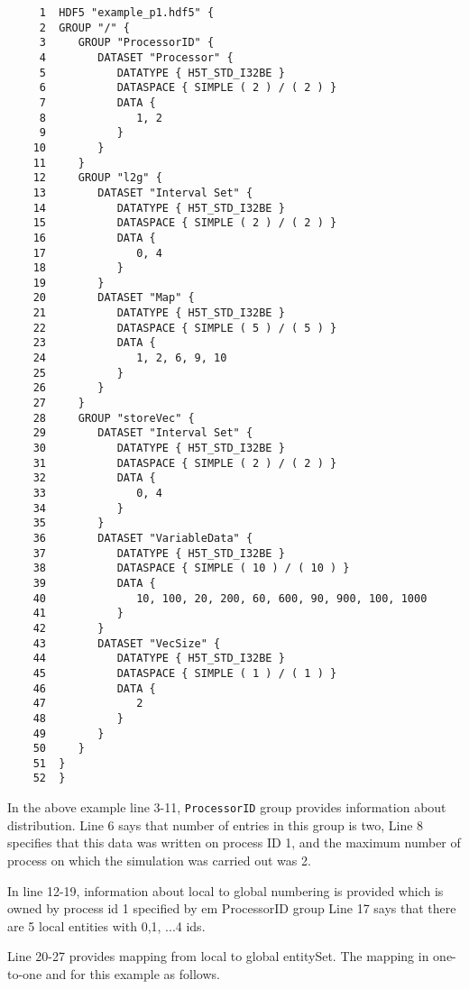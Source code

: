 \begin{verbatim} 
     1  HDF5 "example_p1.hdf5" {
     2  GROUP "/" {
     3     GROUP "ProcessorID" {
     4        DATASET "Processor" {
     5           DATATYPE { H5T_STD_I32BE }
     6           DATASPACE { SIMPLE ( 2 ) / ( 2 ) }
     7           DATA {
     8              1, 2
     9           }
    10        }
    11     }
    12     GROUP "l2g" {
    13        DATASET "Interval Set" {
    14           DATATYPE { H5T_STD_I32BE }
    15           DATASPACE { SIMPLE ( 2 ) / ( 2 ) }
    16           DATA {
    17              0, 4
    18           }
    19        }
    20        DATASET "Map" {
    21           DATATYPE { H5T_STD_I32BE }
    22           DATASPACE { SIMPLE ( 5 ) / ( 5 ) }
    23           DATA {
    24              1, 2, 6, 9, 10
    25           }
    26        }
    27     }
    28     GROUP "storeVec" {
    29        DATASET "Interval Set" {
    30           DATATYPE { H5T_STD_I32BE }
    31           DATASPACE { SIMPLE ( 2 ) / ( 2 ) }
    32           DATA {
    33              0, 4
    34           }
    35        }
    36        DATASET "VariableData" {
    37           DATATYPE { H5T_STD_I32BE }
    38           DATASPACE { SIMPLE ( 10 ) / ( 10 ) }
    39           DATA {
    40              10, 100, 20, 200, 60, 600, 90, 900, 100, 1000
    41           }
    42        }
    43        DATASET "VecSize" {
    44           DATATYPE { H5T_STD_I32BE }
    45           DATASPACE { SIMPLE ( 1 ) / ( 1 ) }
    46           DATA {
    47              2
    48           }
    49        }
    50     }
    51  }
    52  }
\end{verbatim} 

\par In the above example line 3-11, {\tt ProcessorID} group provides 
information about distribution. Line 6 says that number of entries in
this group is two, Line 8 specifies that this data was written on
process ID 1, and the maximum number of process on which
the simulation was carried out was 2. \\

\par In line 12-19, information about local to global numbering is
provided which is owned by process id 1 {specified by {em ProcessorID}
group} Line 17 says that there are 5 local entities with {0,1, ...4} ids. 

\par Line 20-27 provides mapping from local to global entitySet. The
mapping in one-to-one and for this example as follows.

